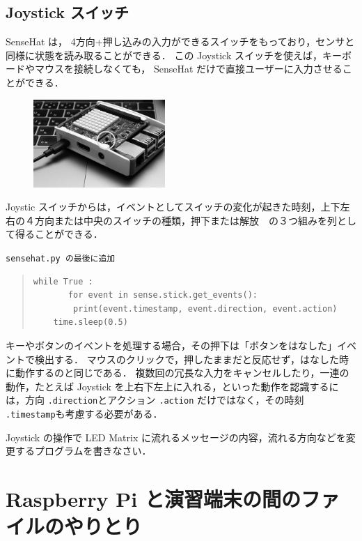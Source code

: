 \documentclass[11pt,a4,epsf]{report}
\begin{document}
\subsection{Joystick スイッチ}
SenseHat は， 4方向+押し込みの入力ができるスイッチをもっており，センサと同様に状態を読み取ることができる．
この Joystick スイッチを使えば，キーボードやマウスを接続しなくても， SenseHat だけで直接ユーザーに入力させることができる．

\begin{figure}
\centering
\includegraphics[width=5cm]{joystick.jpg}
\end{figure}

Joystic スイッチからは，イベントとしてスイッチの変化が起きた時刻，上下左右の４方向または中央のスイッチの種類，押下または解放　の３つ組みを列として得ることができる．
\begin{itembox}[l]{\tt sensehat.py の最後に追加}
\begin{quote}
\small
\begin{verbatim}
while True :
       for event in sense.stick.get_events():
        print(event.timestamp, event.direction, event.action)
    time.sleep(0.5)
\end{verbatim}
\end{quote}
\end{itembox}
キーやボタンのイベントを処理する場合，その押下は「ボタンをはなした」イベントで検出する．
マウスのクリックで，押したままだと反応せず，はなした時に動作するのと同じである．
複数回の冗長な入力をキャンセルしたり，一連の動作，たとえば Joystick を上右下左上に入れる，といった動作を認識するには，方向 \verb+.direction+とアクション \verb+.action+ だけではなく，その時刻 \verb+.timestamp+も考慮する必要がある．

\begin{excercise}
Joystick の操作で LED Matrix に流れるメッセージの内容，流れる方向などを変更するプログラムを書きなさい．
\end{excercise}


\section{Raspberry Pi と演習端末の間のファイルのやりとり}
\end{document}
